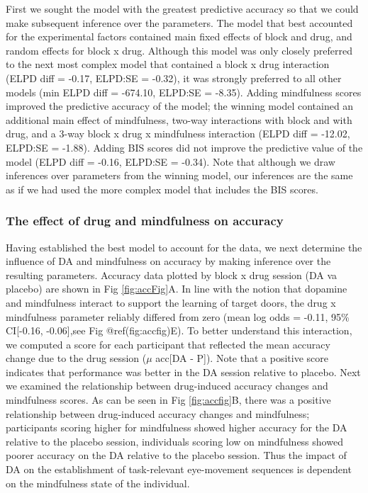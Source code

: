 \documentclass{article}
\begin{document}
First we sought the model with the greatest predictive accuracy so that
we could make subsequent inference over the parameters. The model that
best accounted for the experimental factors contained main fixed effects
of block and drug, and random effects for block x drug. Although this
model was only closely preferred to the next most complex model that
contained a block x drug interaction (ELPD diff = -0.17, ELPD:SE =
-0.32), it was strongly preferred to all other models (min ELPD diff =
-674.10, ELPD:SE = -8.35). Adding mindfulness scores improved the
predictive accuracy of the model; the winning model contained an
additional main effect of mindfulness, two-way interactions with block
and with drug, and a 3-way block x drug x mindfulness interaction (ELPD
diff = -12.02, ELPD:SE = -1.88). Adding BIS scores did not improve the
predictive value of the model (ELPD diff = -0.16, ELPD:SE = -0.34). Note
that although we draw inferences over parameters from the winning model,
our inferences are the same as if we had used the more complex model
that includes the BIS scores.

\hypertarget{the-effect-of-drug-and-mindfulness-on-accuracy}{%
\subsubsection{The effect of drug and mindfulness on
accuracy}\label{the-effect-of-drug-and-mindfulness-on-accuracy}}

Having established the best model to account for the data, we next
determine the influence of DA and mindfulness on accuracy by making
inference over the resulting parameters. Accuracy data plotted by block
x drug session (DA va placebo) are shown in Fig \ref{fig:accFig}A. In
line with the notion that dopamine and mindfulness interact to support
the learning of target doors, the drug x mindfulness parameter reliably
differed from zero (mean log odds = -0.11, 95\% CI{[}-0.16, -0.06{]},see
Fig @ref(fig:accfig)E). To better understand this interaction, we
computed a score for each participant that reflected the mean accuracy
change due to the drug session (\(\mu\) acc{[}DA - P{]}). Note that a
positive score indicates that performance was better in the DA session
relative to placebo. Next we examined the relationship between
drug-induced accuracy changes and mindfulness scores. As can be seen in
Fig \ref{fig:accfig}B, there was a positive relationship between
drug-induced accuracy changes and mindfulness; participants scoring
higher for mindfulness showed higher accuracy for the DA relative to the
placebo session, individuals scoring low on mindfulness showed poorer
accuracy on the DA relative to the placebo session. Thus the impact of
DA on the establishment of task-relevant eye-movement sequences is
dependent on the mindfulness state of the individual.
\end{document}
